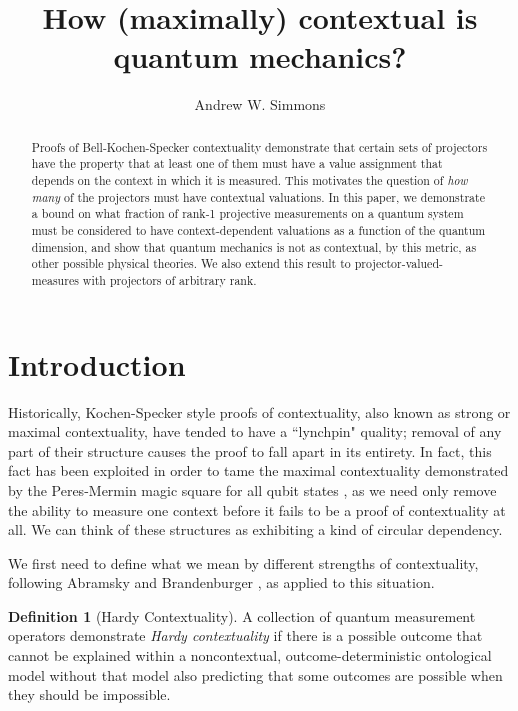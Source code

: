 \documentclass{amsart}
\theoremstyle{definition}
\newtheorem{defn}{Definition}
\begin{document}
\title{How (maximally) contextual is quantum mechanics?}
\author{Andrew W. Simmons}
\address{Department of Physics, Imperial College London, SW7 2AZ.}
\begin{abstract}
Proofs of Bell-Kochen-Specker contextuality demonstrate that certain sets of projectors have the property that at least one of them must have a value assignment that depends on the context in which it is measured. This motivates the question of \emph{how many} of the projectors must have contextual valuations. In this paper, we demonstrate a bound on what fraction of rank-1 projective measurements on a quantum system must be considered to have context-dependent valuations as a function of the quantum dimension, and show that quantum mechanics is not as contextual, by this metric, as other possible physical theories. We also extend this result to projector-valued-measures with projectors of arbitrary rank.
\end{abstract}
\maketitle
\section{Introduction}

Historically, Kochen-Specker style proofs of contextuality, also known as strong or maximal contextuality, have tended to have a ``lynchpin" quality; removal of any part of their structure causes the proof to fall apart in its entirety.  In fact, this fact has been exploited in order to tame the maximal contextuality demonstrated by the Peres-Mermin magic square for all qubit states \cite{Berm2016}, as we need only remove the ability to measure one context before it fails to be a proof of contextuality at all. We can think of these structures as exhibiting a kind of circular dependency.

We first need to define what we mean by different strengths of contextuality, following Abramsky and Brandenburger \cite{Abra2011}, as applied to this situation.

\begin{defn}[Hardy Contextuality]
A collection of quantum measurement operators demonstrate \emph{Hardy contextuality} if there is a possible outcome that cannot be explained within a noncontextual, outcome-deterministic ontological model without that model also predicting that some outcomes are possible when they should be impossible.
\end{defn}
\end{document}
